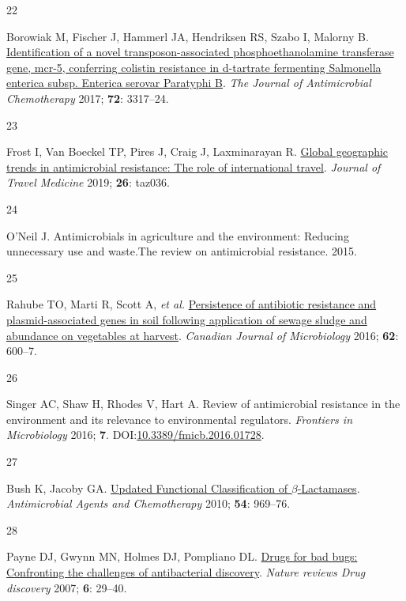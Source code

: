 \documentclass[
  11pt,
  paper=a4,
  ,captions=tableheading
]{scrartcl}
\newlength{\cslhangindent}
\newlength{\csllabelwidth}
\newenvironment{CSLReferences}[2] %
 {%
  \setlength{\parindent}{0pt}
  \ifodd #1 \everypar{\setlength{\hangindent}{\cslhangindent}}\ignorespaces\fi
  \ifnum #2 > 0
  \setlength{\parskip}{#2\baselineskip}
  \fi
 }%
 {}
\newcommand{\CSLLeftMargin}[1]{\parbox[t]{\csllabelwidth}{#1}}
\newcommand{\CSLRightInline}[1]{\parbox[t]{\linewidth - \csllabelwidth}{#1}\break}
\begin{document}
\begin{CSLReferences}{0}{0}
\leavevmode{}%
\CSLLeftMargin{22 }
\CSLRightInline{Borowiak M, Fischer J, Hammerl JA, Hendriksen RS, Szabo
I, Malorny B. \href{https://doi.org/10.1093/jac/dkx327}{Identification
of a novel transposon-associated phosphoethanolamine transferase gene,
mcr-5, conferring colistin resistance in d-tartrate fermenting
{Salmonella} enterica subsp. Enterica serovar {Paratyphi B}}. \emph{The
Journal of Antimicrobial Chemotherapy} 2017; \textbf{72}: 3317--24.}

\leavevmode{}%
\CSLLeftMargin{23 }
\CSLRightInline{Frost I, Van Boeckel TP, Pires J, Craig J, Laxminarayan
R. \href{https://doi.org/10.1093/jtm/taz036}{Global geographic trends in
antimicrobial resistance: The role of international travel}.
\emph{Journal of Travel Medicine} 2019; \textbf{26}: taz036.}

\leavevmode{}%
\CSLLeftMargin{24 }
\CSLRightInline{O'Neil J. Antimicrobials in agriculture and the
environment: Reducing unnecessary use and waste.{The} review on
antimicrobial resistance. 2015.}

\leavevmode{}%
\CSLLeftMargin{25 }
\CSLRightInline{Rahube TO, Marti R, Scott A, \emph{et al.}
\href{https://doi.org/10.1139/cjm-2016-0034}{Persistence of antibiotic
resistance and plasmid-associated genes in soil following application of
sewage sludge and abundance on vegetables at harvest}. \emph{Canadian
Journal of Microbiology} 2016; \textbf{62}: 600--7.}

\leavevmode{}%
\CSLLeftMargin{26 }
\CSLRightInline{Singer AC, Shaw H, Rhodes V, Hart A. Review of
antimicrobial resistance in the environment and its relevance to
environmental regulators. \emph{Frontiers in Microbiology} 2016;
\textbf{7}.
DOI:\href{https://doi.org/10.3389/fmicb.2016.01728}{10.3389/fmicb.2016.01728}.}

\leavevmode{}%
\CSLLeftMargin{27 }
\CSLRightInline{Bush K, Jacoby GA.
\href{https://doi.org/10.1128/AAC.01009-09}{Updated {Functional
Classification} of {\(\beta\)}-{Lactamases}}. \emph{Antimicrobial Agents
and Chemotherapy} 2010; \textbf{54}: 969--76.}

\leavevmode{}%
\CSLLeftMargin{28 }
\CSLRightInline{Payne DJ, Gwynn MN, Holmes DJ, Pompliano DL.
\href{https://doi.org/10.1038/nrd2201}{Drugs for bad bugs: Confronting
the challenges of antibacterial discovery}. \emph{Nature reviews Drug
discovery} 2007; \textbf{6}: 29--40.}


\end{CSLReferences}
\end{document}

